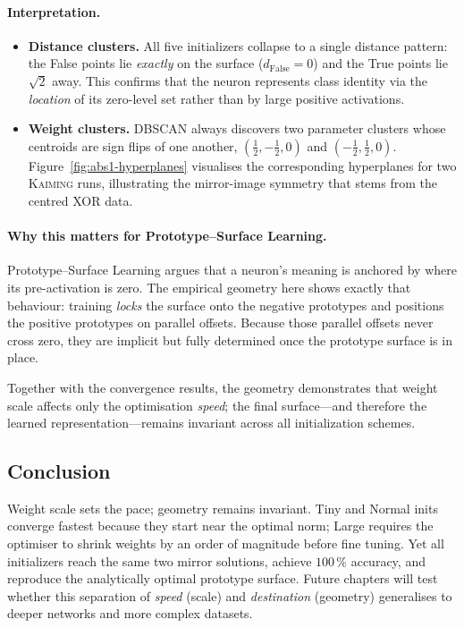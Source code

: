 \paragraph{Interpretation.}
\begin{itemize}
  \item \textbf{Distance clusters.}  
        All five initializers collapse to a single distance pattern:
        the False points lie \emph{exactly} on the surface
        ($d_{\text{False}}=0$) and the True points lie \(\sqrt2\) away.
        This confirms that the neuron represents class identity via the
        \emph{location} of its zero-level set rather than by large positive
        activations.
  \item \textbf{Weight clusters.}  
        DBSCAN always discovers two parameter clusters whose centroids are
        sign flips of one another,
        \((\frac12,-\frac12,0)\) and \((-\frac12,\frac12,0)\).
        Figure~\ref{fig:abs1-hyperplanes} visualises the corresponding
        hyperplanes for two \textsc{Kaiming} runs, illustrating the
        mirror-image symmetry that stems from the centred XOR data.
\end{itemize}

\paragraph{Why this matters for Prototype–Surface Learning.}
Prototype–Surface Learning argues that a neuron’s meaning is anchored by
where its pre-activation is zero.  The empirical geometry here shows exactly
that behaviour: training \emph{locks} the surface onto the negative prototypes
and positions the positive prototypes on parallel offsets.  Because those
parallel offsets never cross zero, they are implicit but fully determined once
the prototype surface is in place.

Together with the convergence results, the geometry demonstrates that weight
scale affects only the optimisation \emph{speed}; the final surface—and
therefore the learned representation—remains invariant across all
initialization schemes.

\subsection*{Conclusion}

Weight scale sets the pace; geometry remains invariant.  Tiny and Normal
inits converge fastest because they start near the optimal norm; Large
requires the optimiser to shrink weights by an order of magnitude before fine
tuning.  Yet all initializers reach the same two mirror solutions, achieve
$100\,\%$ accuracy, and reproduce the analytically optimal prototype surface.
Future chapters will test whether this separation of \emph{speed} (scale) and
\emph{destination} (geometry) generalises to deeper networks and more complex
datasets.


